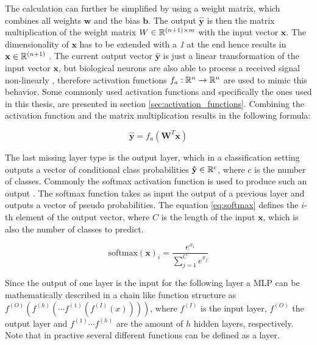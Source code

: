 The calculation can further be simplified by using a weight matrix, which combines all weights $\mathbf{w}$ and the bias $\mathbf{b}$.
The output $\mathbf{\hat{y}}$ is then the matrix multiplication of the weight matrix $W \in \mathbb{R}^{(n+1) \times m}$ with the input vector $\mathbf{x}$.
The dimensionality of $\mathbf{x}$ has to be extended with a \textit{1} at the end hence results in $\mathbf{x} \in \mathbb{R}^{(n+1)}$ \cite{dl}.
The current output vector $\mathbf{\hat{y}}$ is just a linear transformation of the input vector $\mathbf{x}$, but biological neurons are also able to process a received signal non-linearly \cite{dl_mit}, therefore activation functions $f_{a}: \mathbb{R}^n \to \mathbb{R}^n$ are used to mimic this behavior.
Some commonly used activation functions and specifically the ones used in this thesis, are presented in section \ref{sec:activation_functions}.
Combining the activation function and the matrix multiplication results in the following formula:

\begin{equation}
    \mathbf{\hat{y}} = f_a(\mathbf{W}^T\mathbf{x})
    \label{eq:fc_weights}
\end{equation}

The last missing layer type is the output layer, which in a classification setting outputs a vector of conditional class probabilities $\mathbf{\hat{y}} \in \mathbb{R}^c$, where $c$ is the number of classes.
Commonly the softmax activation function is used to produce such an output \cite{softmax}.
The softmax function takes as input the output of a previous layer and outputs a vector of pseudo probabilities.
The equation \ref{eq:softmax} defines the $i$-th element of the output vector, where $C$ is the length of the input $\mathbf{x}$, which is also the number of classes to predict.

\begin{equation}
    \text{softmax}(\mathbf{x})_i = \frac{e^{x_i}}{\sum_{j=1}^Ce^{x_j}}
    \label{eq:softmax}
\end{equation}

Since the output of one layer is the input for the following layer a \ac{MLP} can be mathematically described in a chain like function structure as $f^{(O)}( f^{(h)} ( \cdots f^{(1)} (f^{(I)}(x))))$, where $f^{(I)}$ is the input layer, $f^{(O)}$ the output layer and $f^{(1)} \cdots f^{(h)}$ are the amount of $h$ hidden layers, respectively. Note that in practive several different functions can be defined as a layer.



